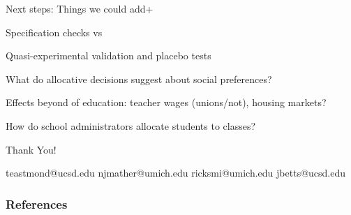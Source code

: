 \documentclass[t,aspectratio=169,11pt]{beamer}
\begin{document}

\begin{frame}{Next steps: Things we could add}+
\begin{wideitemize}

    \item Specification checks vs \citep{chetty2014measuring1,Delgado2020,pope2017multidimensional}
    \item Quasi-experimental validation and placebo tests
    \item What do allocative decisions suggest about social preferences?
    \item Effects beyond of education: teacher wages (unions/not), housing markets?
    \item How do school administrators allocate students to classes?
    

\end{wideitemize}
   

\end{frame}



\begin{frame}[c,noframenumbering]
\centering
\Huge{\centerline{Thank You!}}

\normalsize  teastmond@ucsd.edu \hspace{1em} njmather@umich.edu \hspace{1em} ricksmi@umich.edu \hspace{1em} jbetts@ucsd.edu

\end{frame}



\begin{frame}
\frametitle{References}
\tiny

\end{frame}




\end{document}
